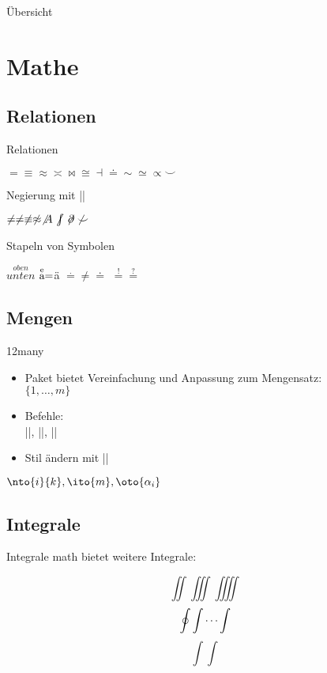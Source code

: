 \documentclass[
	vorläufig=false,
	datum=2017-11-17,
	titel={Mathematiksatz II},
	web=true,
	mo,
	aspectratio=1610,
]{../tex/latexkurs-slides}
\begin{document}
\begin{frame}{Übersicht}
	\tableofcontents
\end{frame}



\section{Mathe}
\subsection{Relationen}
\begin{frame}[fragile]{Relationen}
\begin{LTXexample}
$= \equiv \approx \asymp \bowtie \cong \dashv \doteq \sim \simeq \propto \smile$
\end{LTXexample}
\pause Negierung mit |\not|

\begin{LTXexample} 
$\not = \neq \not\equiv
\not \approx \not A
\not\kern-.2em\int \not\kern-.2em\partial \not \smile$
\end{LTXexample}
\pause Stapeln von Symbolen

\begin{LTXexample}
$\stackrel{oben}{unten}$
$\stackrel{\text e}{\text a}=$ä
$\stackrel . = \neq \doteq$
$\stackrel != \stackrel ?=$
\end{LTXexample}
\end{frame}


\subsection{Mengen}
\begin{frame}[fragile]{12many}
\begin{itemize}
\item Paket  bietet Vereinfachung und Anpassung zum Mengensatz:\\%
$\{1, \dots, m\}$
\item Befehle:\\
||, ||, ||
\item Stil ändern mit ||
\end{itemize}
\begin{LTXexample}[width=.6\textwidth]
$ \nto{i}{k},
  \ito{m},
  \oto{\alpha_i} $
\end{LTXexample}
\end{frame}


\subsection{Integrale}
\begin{frame}[fragile]{Integrale}
\AmS{}math bietet weitere Integrale:
\begin{LTXexample}[width=.45\textwidth]
\[ \iint \iiint \iiiint \]
\[ \oint \idotsint \]
\[ \int \int \]
\end{LTXexample}
\end{frame}
\end{document}
